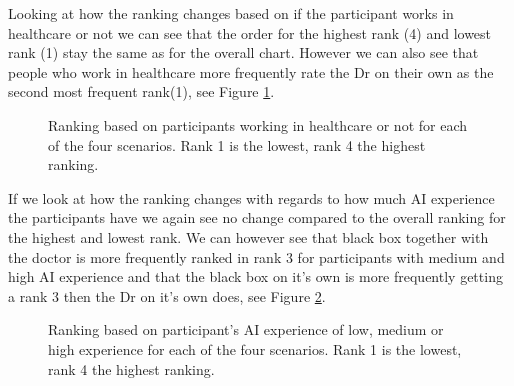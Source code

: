 \documentclass[manuscript,screen,review]{acmart}
\begin{document}
Looking at how the ranking changes based on if the participant works in healthcare or not we can see that the order for the highest rank (4) and lowest rank (1) stay the same as for the overall chart. However we can also see that people who work in healthcare more frequently rate the Dr on their own as the second most frequent rank(1), see Figure \ref{fig:ranking-healthcare}.

\begin{figure}[h]
    \caption{Ranking based on participants working in healthcare or not for each of the four scenarios. Rank 1 is the lowest, rank 4 the highest ranking.}
    \label{fig:ranking-healthcare}
\end{figure}

If we look at how the ranking changes with regards to how much AI experience the participants have we again see no change compared to the overall ranking for the highest and lowest rank. We can however see that black box together with the doctor is more frequently ranked in rank 3 for participants with medium and high AI experience and that the black box on it's own is more frequently getting a rank 3 then the Dr on it's own does, see Figure \ref{fig:ranking-ai}.

\begin{figure}[h]
    \caption{Ranking based on participant's AI experience of low, medium or high experience for each of the four scenarios. Rank 1 is the lowest, rank 4 the highest ranking.}
    \label{fig:ranking-ai}
\end{figure}
\end{document}
